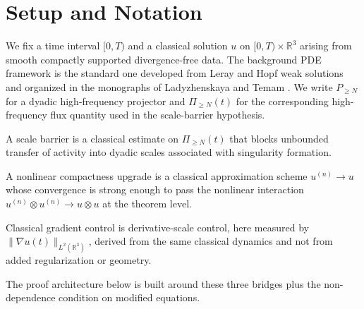 \section{Setup and Notation}

We fix a time interval \([0,T)\) and a classical solution \(u\) on \([0,T)\times\mathbb{R}^3\) arising from smooth compactly supported divergence-free data. The background PDE framework is the standard one developed from Leray and Hopf weak solutions and organized in the monographs of Ladyzhenskaya and Temam \cite{Leray1934,Hopf1951,Ladyzhenskaya1969,Temam2001}. We write \(P_{\ge N}\) for a dyadic high-frequency projector and \(\Pi_{\ge N}(t)\) for the corresponding high-frequency flux quantity used in the scale-barrier hypothesis.

\begin{definition}
A scale barrier is a classical estimate on \(\Pi_{\ge N}(t)\) that blocks unbounded transfer of activity into dyadic scales associated with singularity formation.
\end{definition}

\begin{definition}
A nonlinear compactness upgrade is a classical approximation scheme \(u^{(n)}\to u\) whose convergence is strong enough to pass the nonlinear interaction \(u^{(n)}\otimes u^{(n)}\to u\otimes u\) at the theorem level.
\end{definition}

\begin{definition}
Classical gradient control is derivative-scale control, here measured by \(\|\nabla u(t)\|_{L^2(\mathbb{R}^3)}\), derived from the same classical dynamics and not from added regularization or geometry.
\end{definition}

The proof architecture below is built around these three bridges plus the non-dependence condition on modified equations.
